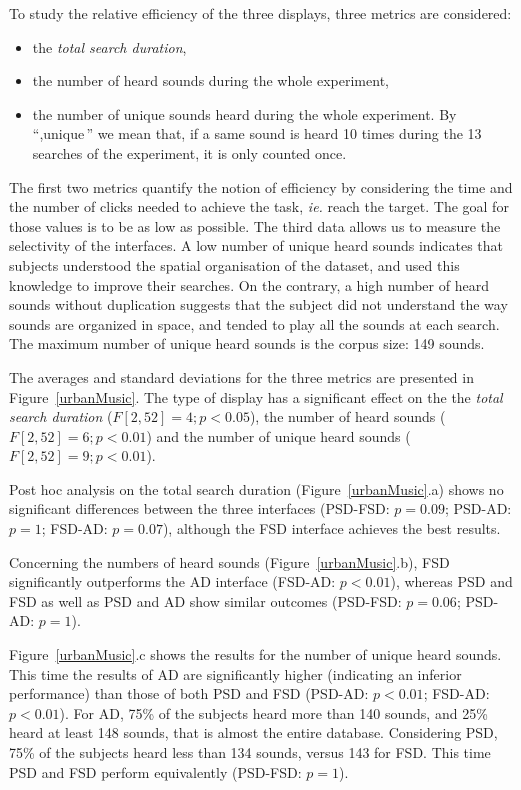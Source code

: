 \documentclass{aes2e}
\begin{document}
To study the relative efficiency of the three displays, three metrics are considered: 

\begin{itemize}
\item the \textit{total search duration},
\item the number of heard sounds during the whole experiment,
\item the number of unique sounds heard during the whole experiment. By ``,unique\,'' we mean that, if a same sound is heard 10 times during the 13 searches of the  experiment, it is only counted once. 
\end{itemize}

The first two metrics quantify the notion of efficiency by considering the time and the number of clicks needed to achieve the task, \textit{ie.} reach the target. The goal for those values is to be as low as possible. The third data allows us to measure the selectivity of the interfaces. A low number of unique heard sounds indicates that subjects understood the spatial organisation of the dataset, and used this knowledge to improve their searches. On the contrary, a high number of heard sounds without duplication suggests that the subject did not understand the way sounds are organized in space, and tended to play all the sounds at each search. The maximum number of unique heard sounds is the corpus size: 149 sounds.

The averages and standard deviations for the three metrics are presented in Figure~\ref{urbanMusic}. The type of display has a significant effect on the the \textit{total search duration} ($F[2,52]=4; p<0.05$), the number of heard sounds ($F[2,52]=6; p<0.01$) and the number of unique heard sounds ($F[2,52]=9; p<0.01$). 

Post hoc analysis on the total search duration (Figure~\ref{urbanMusic}.a) shows no significant differences between the three interfaces (PSD-FSD: $p=0.09$; PSD-AD: $p=1$; FSD-AD: $p=0.07$), although the FSD interface achieves the best results.

Concerning the numbers of heard sounds (Figure~\ref{urbanMusic}.b), FSD significantly outperforms the AD interface (FSD-AD: $p<0.01$),  whereas PSD and FSD as well as PSD and AD show similar outcomes (PSD-FSD: $p=0.06$; PSD-AD: $p=1$).

Figure~\ref{urbanMusic}.c shows the results for the number of unique heard sounds. This time the results of AD are significantly higher (indicating an inferior performance) than those of both PSD and FSD (PSD-AD: $p<0.01$; FSD-AD: $p<0.01$).  For AD, 75\% of the subjects heard more than 140 sounds, and 25\% heard at least 148 sounds, that is almost the entire database. Considering PSD, 75\% of the subjects heard less than 134 sounds, versus 143 for FSD. This time PSD and FSD perform equivalently (PSD-FSD: $p=1$).
\end{document}

